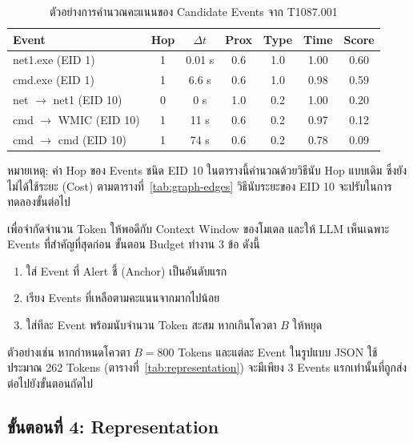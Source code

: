 \begin{table}[ht]
  \centering
  \caption{ตัวอย่างการคำนวณคะแนนของ Candidate Events จาก T1087.001}
  \label{tab:score-example}
  \begin{tabular}{|l|c|c|c|c|c|c|}
    \hline
    \textbf{Event} & \textbf{Hop} & \textbf{$\Delta t$} & \textbf{Prox} & \textbf{Type} & \textbf{Time} & \textbf{Score} \\ \hline
    net1.exe (EID 1)         & 1 & 0.01 s & 0.6 & 1.0 & 1.00 & 0.60 \\ \hline
    cmd.exe (EID 1)          & 1 & 6.6 s  & 0.6 & 1.0 & 0.98 & 0.59 \\ \hline
    net $\rightarrow$ net1 (EID 10) & 0 & 0 s & 1.0 & 0.2 & 1.00 & 0.20 \\ \hline
    cmd $\rightarrow$ WMIC (EID 10) & 1 & 11 s & 0.6 & 0.2 & 0.97 & 0.12 \\ \hline
    cmd $\rightarrow$ cmd (EID 10)  & 1 & 74 s & 0.6 & 0.2 & 0.78 & 0.09 \\ \hline
  \end{tabular}

  \vspace{1mm}
  {\footnotesize หมายเหตุ: ค่า Hop ของ Events ชนิด EID 10 ในตารางนี้คำนวณด้วยวิธีนับ Hop แบบเดิม
  ซึ่งยังไม่ได้ใช้ระยะ (Cost) ตามตารางที่~\ref{tab:graph-edges}
  วิธีนับระยะของ EID 10 จะปรับในการทดลองขั้นต่อไป\par}
\end{table}

เพื่อจำกัดจำนวน Token ให้พอดีกับ Context Window ของโมเดล และให้ LLM เห็นเฉพาะ Events ที่สำคัญที่สุดก่อน
ขั้นตอน Budget ทำงาน 3 ข้อ ดังนี้
\begin{enumerate}
  \item ใส่ Event ที่ Alert ชี้ (Anchor) เป็นอันดับแรก
  \item เรียง Events ที่เหลือตามคะแนนจากมากไปน้อย
  \item ใส่ทีละ Event พร้อมนับจำนวน Token สะสม หากเกินโควตา $B$ ให้หยุด
\end{enumerate}
ตัวอย่างเช่น หากกำหนดโควตา $B = 800$ Tokens และแต่ละ Event ในรูปแบบ JSON ใช้ประมาณ 262 Tokens
(ตารางที่~\ref{tab:representation}) จะมีเพียง 3 Events แรกเท่านั้นที่ถูกส่งต่อไปยังขั้นตอนถัดไป

\subsection{ขั้นตอนที่ 4: Representation}
\label{sec:step-rep}

